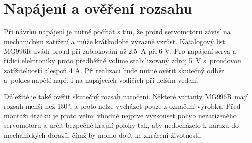 \section{Napájení a ověření rozsahu}

Při návrhu napájení je nutné počítat s tím, že proud servomotoru závisí na mechanickém zatížení a může krátkodobě výrazně vzrůst. Katalogový list MG996R uvádí proud při zablokování až 2,5~A při 6 V. Pro napájení serva a řídicí elektroniky proto předběžně volíme stabilizovaný zdroj 5~V s~proudovou zatížitelností alespoň 4 A. Při realizaci bude nutné ověřit skutečný odběr a~pokles napětí např. i na napájecích vodičích při delším vedení.~\cite{mgpdf}

Důležité je také ověřit skutečný rozsah natočení. Některé varianty MG996R mají rozsah menší než 180°, a proto nelze vycházet pouze z označení výrobku. Před montáží držáku je proto velmi vhodné nejprve vyzkoušet pohyb nezatíženého servomotoru a určit bezpečné krajní polohy tak, aby nedocházelo k nárazu do mechanických dorazů, čímž by mohlo dojít ke zkrácení životnosti.
